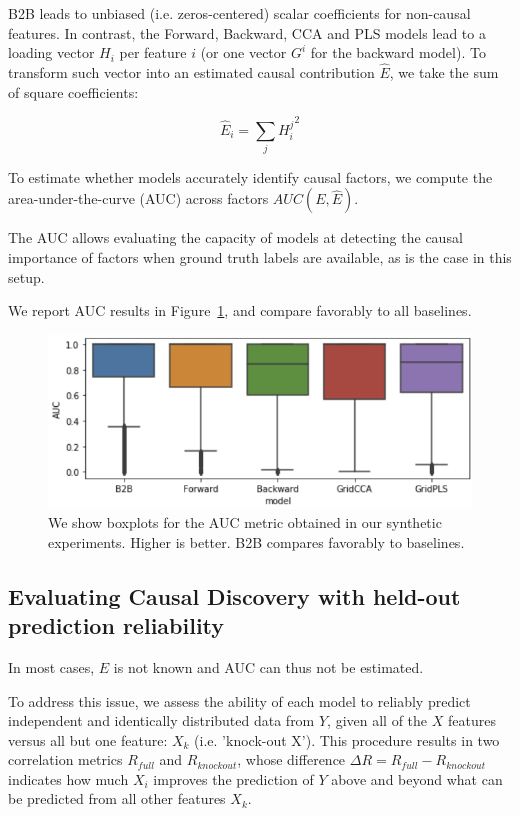 B2B leads to unbiased (i.e. zeros-centered) scalar coefficients for non-causal
features. In contrast, the Forward, Backward, CCA and PLS models lead to a
loading vector $H_i$ per feature $i$ (or one vector $G^i$ for the backward
model). To transform such vector into an estimated causal contribution $\hat E$,
we take the sum of square coefficients:

\begin{equation} \hat E_i = \sum_j {H^j_i}^2 \end{equation}

To estimate whether models accurately identify causal factors, we compute the
area-under-the-curve (AUC) across factors $AUC(E, \hat E)$.

The AUC allows evaluating the capacity of models at detecting the causal
importance of factors when ground truth labels are available, as is the case in
this setup.

We report AUC results in Figure~\ref{fig:auc_plots}, and compare favorably to all baselines.

\begin{figure}
  \centering
  \includegraphics[width=0.8\linewidth]{figures/AUC.png}
  \caption{We show boxplots for the AUC metric obtained in our synthetic experiments. Higher is better. B2B compares favorably to baselines.}
  \label{fig:auc_plots}
\end{figure}

\subsection{Evaluating Causal Discovery with held-out prediction reliability}

In most cases, $E$ is not known and AUC can thus not be estimated.

To address this issue, we assess the ability of each model to reliably predict
independent and identically distributed data from $Y$, given all of the $X$
features versus all but one feature: $X_k$ (i.e. 'knock-out X'). This procedure
results in two correlation metrics $R_{full}$ and $R_{knockout}$, whose
difference $\Delta R=R_{full}-R_{knockout}$ indicates how much $X_i$ improves
the prediction of $Y$ above and beyond what can be predicted from all other
features $X_k$.

